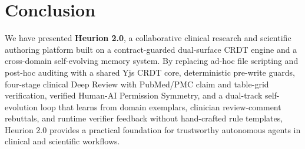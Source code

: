 \documentclass[11pt,a4paper]{article}
\begin{document}
\section{Conclusion}
\label{sec:conclusion}

We have presented \textbf{Heurion 2.0}, a collaborative clinical research and scientific authoring platform built on a contract-guarded dual-surface CRDT engine and a cross-domain self-evolving memory system. By replacing ad-hoc file scripting and post-hoc auditing with a shared Yjs CRDT core, deterministic pre-write guards, four-stage clinical Deep Review with PubMed/PMC claim and table-grid verification, verified Human-AI Permission Symmetry, and a dual-track self-evolution loop that learns from domain exemplars, clinician review-comment rebuttals, and runtime verifier feedback without hand-crafted rule templates, Heurion 2.0 provides a practical foundation for trustworthy autonomous agents in clinical and scientific workflows.
\end{document}
